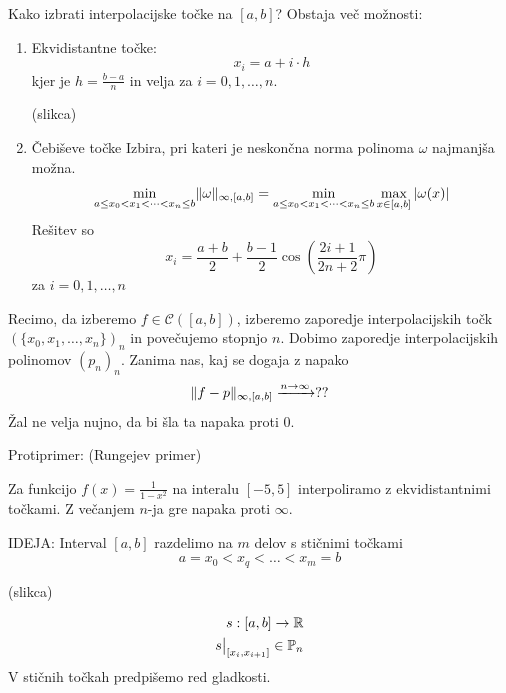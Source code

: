 \documentclass[a4paper,12pt]{article}
\DeclarePairedDelimiter\norm{\lVert}{\rVert}
\theoremstyle{definition}
\theoremstyle{remark}
\newcommand{\R}{\mathbb{R}}
\newcommand{\Pp}{\mathbb{P}}
\newcounter{subsubsubsection}[subsubsection]
\newcommand\restr[2]{{%
  \left.\kern-\nulldelimiterspace %
  #1 %
  \littletaller %
  \right|_{#2} %
  }}
\newcommand{\littletaller}{\mathchoice{\vphantom{\big|}}{}{}{}}
\begin{document}
Kako izbrati interpolacijske točke na $[a, b]$? Obstaja več možnosti:
\begin{enumerate}
    \item Ekvidistantne točke:
    \begin{equation*}
        x_i = a + i \cdot h
    \end{equation*}
    kjer je $h = \frac{b-a}{n}$ in velja za $i = 0, 1, \dots, n$.

    (slikca)
    \item Čebiševe točke
    Izbira, pri kateri je neskončna norma polinoma $\omega$ najmanjša možna.
    \begin{equation*}
        \min_{a \leq x_0 < x_1 < \dots < x_n \leq b} \norm{\omega}_{\infty, [a, b]} = \min_{a \leq x_0 < x_1 < \dots < x_n \leq b} \max_{x \in [a, b]} | \omega(x) |
    \end{equation*}
    Rešitev so
    \begin{equation*}
        x_i = \frac{a+b}{2} + \frac{b-1}{2}\cos(\frac{2i+1}{2n+2}\pi)
    \end{equation*}
    za $i = 0, 1, \dots, n$
\end{enumerate}

Recimo, da izberemo $f \in \mathscr{C}([a, b])$, izberemo zaporedje interpolacijskih točk $(\{x_0, x_1, \dots, x_n\})_n$ in
povečujemo stopnjo $n$. Dobimo zaporedje interpolacijskih polinomov $(p_n)_n$. Zanima nas, kaj se dogaja z napako
\begin{equation}
    \norm{f-p}_{\infty, [a, b]} \xrightarrow{n \to \infty} ?? 
\end{equation}
Žal ne velja nujno, da bi šla ta napaka proti 0.

Protiprimer: (Rungejev primer)

Za funkcijo $f(x) = \frac{1}{1-x^2}$ na interalu $[-5, 5]$ interpoliramo z ekvidistantnimi točkami. Z večanjem $n$-ja gre napaka
proti $\infty$.


IDEJA: Interval $[a, b]$ razdelimo na $m$ delov s stičnimi točkami 
\begin{equation*}
    a = x_0 < x_q < \dots < x_m = b
\end{equation*}

(slikca)

\begin{align*}
    s: [a, b] \to \R \\
    \restr{s}{[x_i, x_{i+1}]} \in \Pp_n
\end{align*}
V stičnih točkah predpišemo red gladkosti.
\end{document}
